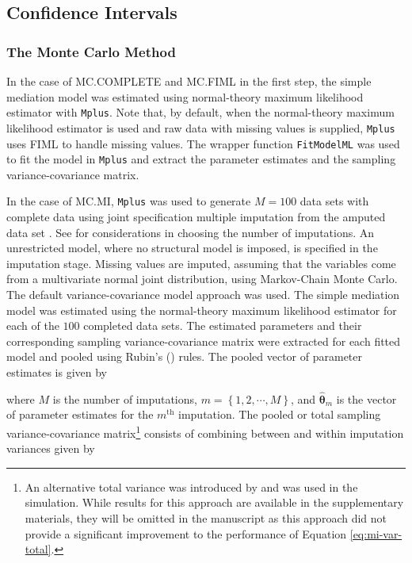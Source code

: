 \documentclass[man]{apa7}\usepackage[]{graphicx}\usepackage[]{xcolor}
\begin{document}
\subsection{Confidence Intervals}

\subsubsection{The Monte Carlo Method}

In the case of MC.COMPLETE and MC.FIML
in the first step,
the simple mediation model was estimated using normal-theory maximum likelihood estimator with \texttt{Mplus}.
Note that, by default, when the normal-theory maximum likelihood estimator is used and raw data with missing values is supplied, \texttt{Mplus} uses FIML to handle missing values.
The wrapper function \texttt{FitModelML} was used to fit the model in \texttt{Mplus} and extract the parameter estimates and the sampling variance-covariance matrix.

In the case of MC.MI,
\texttt{Mplus} was used to generate $M = 100$ data sets with complete data using joint specification multiple imputation from the amputed data set 
\parencite{Lib-Missing-Data-Multiple-Imputation-Asparouhov-2022}.
See
\Textcite{Lib-Missing-Data-Multiple-Imputation-Graham-2007}
for considerations in choosing the number of imputations.
An unrestricted model, where no structural model is imposed, is specified in the imputation stage.
Missing values are imputed, assuming that the variables come from a multivariate normal joint distribution,
using Markov-Chain Monte Carlo.
The default variance-covariance model approach was used.
The simple mediation model was estimated using the normal-theory maximum likelihood estimator for each of the $100$ completed data sets.
The estimated parameters and their corresponding sampling variance-covariance matrix were extracted for each fitted model and pooled using Rubin's (\citeyear{Lib-Missing-Data-Books-Rubin-1987})
rules.
The pooled vector of parameter estimates is given by



\noindent where $M$ is the number of imputations,
$m = \left\{ 1, 2, \cdots, M \right\}$,
and
$\hat{\boldsymbol{\theta}}_{m}$
is the vector of parameter estimates for the $m^{\mathrm{th}}$ imputation.
The pooled or total sampling variance-covariance matrix\footnote{An alternative total variance was introduced by
\Textcite{Lib-Missing-Data-Multiple-Imputation-Li-1991} and was used in the simulation.
While results for this approach are available in the supplementary materials,
they will be omitted in the manuscript as this approach did not provide a significant improvement to the performance of Equation \ref{eq:mi-var-total}.}
consists of combining between and within imputation variances
given by
\end{document}
